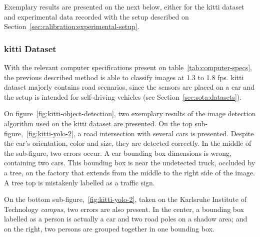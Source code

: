 Exemplary results are presented on the next below, either for the \ac{kitti} dataset and experimental data recorded with the setup described on Section~\ref{sec:calibration:experimental-setup}.
	
\subsubsection{\ac{kitti} Dataset}
With the relevant computer specifications present on table~\ref{tab:computer-specs}, the previous described method is able to classify images at 1.3 to 1.8 \ac{fps}. \ac{kitti} dataset majorly contains road scenarios, since the sensors are placed on a car and the setup is intended for self-driving vehicles (see Section~\ref{sec:sota:datasets}).

On figure~\ref{fig:kitti-object-detection}, two exemplary results of the image detection algorithm used on the \ac{kitti} dataset are presented. On the top sub-figure,~\ref{fig:kitti-yolo-2}, a road intersection with several cars is presented. Despite the car's orientation, color and size, they are detected correctly. In the middle of the sub-figure, two errors occur. A car bounding box dimensions is wrong, containing two cars. This bounding box is near the undetected truck, occluded by a tree, on the factory that extends from the middle to the right side of the image. A tree top is mistakenly labelled as a traffic sign.

On the bottom sub-figure,~\ref{fig:kitti-yolo-2}, taken on the Karlsruhe Institute of Technology \textit{campus}, two errors are also present. In the center, a bounding box labelled as a person is actually a car and two road poles on a shadow area; and on the right, two persons are grouped together in one bounding box.
	
